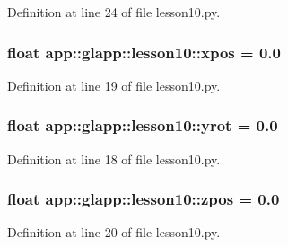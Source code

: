 Definition at line 24 of file lesson10.py.
\subsubsection{\setlength{\rightskip}{0pt plus 5cm}float {\bf app::glapp::lesson10::xpos} = 0.0\hspace{0.3cm}{\tt  [static]}}\label{namespaceapp_1_1glapp_1_1lesson10_3f7c6136b456a1f5c60966cb830424a6}




Definition at line 19 of file lesson10.py.
\subsubsection{\setlength{\rightskip}{0pt plus 5cm}float {\bf app::glapp::lesson10::yrot} = 0.0\hspace{0.3cm}{\tt  [static]}}\label{namespaceapp_1_1glapp_1_1lesson10_af2401e9efe9f0d0f13fcaefa0aa6594}




Definition at line 18 of file lesson10.py.
\subsubsection{\setlength{\rightskip}{0pt plus 5cm}float {\bf app::glapp::lesson10::zpos} = 0.0\hspace{0.3cm}{\tt  [static]}}\label{namespaceapp_1_1glapp_1_1lesson10_0b1691a256e80ef66702389836378ec1}




Definition at line 20 of file lesson10.py.